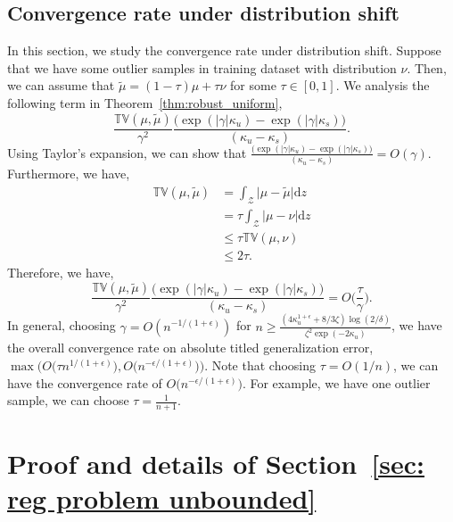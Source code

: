 \documentclass{article}
\theoremstyle{plain}
\theoremstyle{plain}
\theoremstyle{definition}
\theoremstyle{remark}
\newcommand{\mrd}{\mathrm{d}}
\begin{document}
\subsection{Convergence rate under distribution shift}
In this section, we study the convergence rate under distribution shift. Suppose that we have some outlier samples in training dataset with distribution $\nu$. Then, we can assume that $\tilde \mu= (1-\tau) \mu + \tau \nu $ for some $\tau\in[0,1]$. We analysis the following term in Theorem~\ref{thm:robust_uniform},
\begin{equation}
    \frac{\mathbb{TV}(\mu,\tilde{\mu})}{\gamma^2 }\frac{\big(\exp(|\gamma|\kappa_u)-\exp(|\gamma|\kappa_s)\big)}{(\kappa_u-\kappa_s)}.
\end{equation}
Using Taylor's expansion, we can show that $\frac{\big(\exp(|\gamma|\kappa_u)-\exp(|\gamma|\kappa_s)\big)}{(\kappa_u-\kappa_s)}=O(\gamma)$. Furthermore, we have,
\begin{equation}
\begin{split}
        \mathbb{TV}(\mu,\tilde{\mu})&=\int_{\mathcal{Z}}\big|\mu-\tilde {\mu}\big|\mrd z\\
        &= \tau \int_{\mathcal{Z}} |\mu-\nu|\mrd z\\
        &\leq \tau \mathbb{TV}(\mu,\nu)\\
        &\leq 2\tau.
\end{split}
\end{equation}
Therefore, we have,
\begin{equation}
    \frac{\mathbb{TV}(\mu,\tilde{\mu})}{\gamma^2 }\frac{\big(\exp(|\gamma|\kappa_u)-\exp(|\gamma|\kappa_s)\big)}{(\kappa_u-\kappa_s)}=O\Big(\frac{\tau}{\gamma}\Big).
\end{equation}
In general, choosing $\gamma=O(n^{-1/(1+\epsilon)})$ for $n\geq \frac{(4\kappa_u^{1+\epsilon}+8/3 \zeta )\log(2/\delta)}{\zeta^2\exp(-2\kappa_u)}$, we have the overall convergence rate on absolute titled generalization error, $\max\Big( O\Big(\tau n^{1/(1+\epsilon)}\Big), O\big( n^{-\epsilon/(1+\epsilon)}\big)\Big)$.  Note that choosing $\tau=O(1/n)$, we can have the convergence rate of $O\big(n^{-\epsilon/(1+\epsilon)}\big)$. For example, we have one outlier sample, we can choose $\tau=\frac{1}{n+1}$.
\section{Proof and details of Section~\ref{sec: reg problem unbounded}}\label{app:sec: reg problem unbounded}
\end{document}
